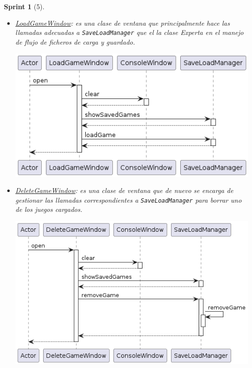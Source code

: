 \documentclass{article}
\theoremstyle{break}
\newtheorem*{sprint}{Sprint}
\begin{document}
\begin{sprint}[5]
\begin{itemize}
\begin{center}
\end{center}

\item \underline{LoadGameWindow}: es una clase de ventana que principalmente hace las llamadas adecuadas a \texttt{SaveLoadManager} que el la clase \textit{Experta} en el manejo de flujo de ficheros de carga y guardado.
\begin{center}
\includegraphics[scale=0.5]{LoadGameWindow_sprint5_seq}
\end{center}

\item \underline{DeleteGameWindow}: es una clase de ventana que de nuevo se encarga de gestionar las llamadas correspondientes a \texttt{SaveLoadManager} para borrar uno de los juegos cargados.
\begin{center}
\includegraphics[scale=0.5]{DeleteGameWindow_sprint5_seq}
\end{center}
\end{itemize}


\end{sprint}
\end{document}
